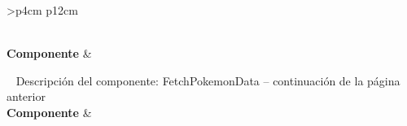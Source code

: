\begin{longtable}{
    >{}p{4cm}
    p{12cm}
    }
    \caption{Descripción del componente: FetchPokemonData} \label{table:descripcion_fetchpokemondata} \\
    \toprule
    \textbf{Componente} &  \\
    \endfirsthead
    
    {{ \tablename\ \thetable{} Descripción del componente: FetchPokemonData -- continuación de la página anterior}} \\
    \toprule
    \textbf{Componente} &  \\
    \midrule
    \endhead
    
    \midrule
     \\ 
    \endfoot
    
    \bottomrule
    \endlastfoot
    

\end{longtable}

